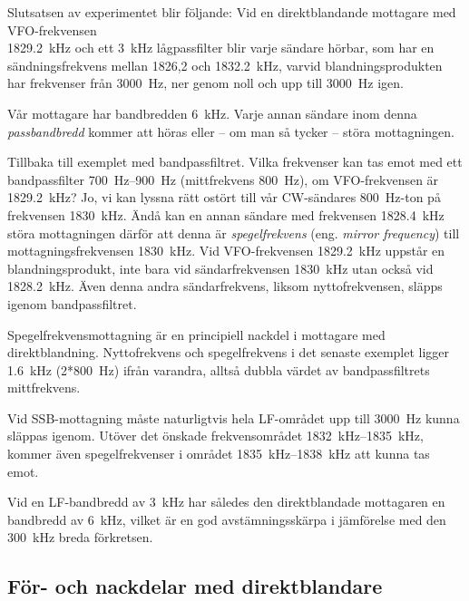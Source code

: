 Slutsatsen av experimentet blir följande:
Vid en direktblandande mottagare med VFO-frekvensen \\ \SI{1829,2}{\kilo\hertz}
och ett \SI{3}{\kilo\hertz} lågpassfilter blir varje sändare hörbar, som har en
sändningsfrekvens mellan 1826,2 och \SI{1832,2}{\kilo\hertz}, varvid
blandningsprodukten har frekvenser från \SI{3000}{\hertz}, ner genom noll och
upp till \SI{3000}{\hertz} igen.


Vår mottagare har bandbredden \SI{6}{\kilo\hertz}.
Varje annan sändare inom denna \emph{passbandbredd} kommer att höras eller --
om man så tycker -- störa mottagningen.

Tillbaka till exemplet med bandpassfiltret.
Vilka frekvenser kan tas emot med ett bandpassfilter \SIrange{700}{900}{\hertz}
(mittfrekvens \SI{800}{\hertz}), om VFO-frekvensen är \SI{1829,2}{\kilo\hertz}?
Jo, vi kan lyssna rätt ostört till vår CW-sändares \SI{800}{\hertz}-ton på
frekvensen \SI{1830}{\kilo\hertz}.
Ändå kan en annan sändare med frekvensen \SI{1828,4}{\kilo\hertz} störa
mottagningen därför att denna är \emph{spegelfrekvens} (eng. \emph{mirror
frequency}) till mottagningsfrekvensen \SI{1830}{\kilo\hertz}.
Vid VFO-frekvensen \SI{1829,2}{\kilo\hertz} uppstår en blandningsprodukt, inte
bara vid sändarfrekvensen \SI{1830}{\kilo\hertz} utan också vid
\SI{1828,2}{\kilo\hertz}.
Även denna andra sändarfrekvens, liksom nyttofrekvensen, släpps igenom
bandpassfiltret.

Spegelfrekvensmottagning är en principiell nackdel i mottagare med
direktblandning.
Nyttofrekvens och spegelfrekvens i det senaste exemplet ligger
\SI{1,6}{\kilo\hertz} (\SI{2*800}{\hertz}) ifrån varandra, alltså dubbla värdet
av bandpassfiltrets mittfrekvens.

Vid SSB-mottagning måste naturligtvis hela LF-området upp till \SI{3000}{\hertz}
kunna släppas igenom.
Utöver det önskade frekvensområdet \SIrange{1832}{1835}{\kilo\hertz}, kommer
även spegelfrekvenser i området \SIrange{1835}{1838}{\kilo\hertz} att kunna tas
emot.

Vid en LF-bandbredd av \SI{3}{\kilo\hertz} har således den direktblandade
mottagaren en bandbredd av \SI{6}{\kilo\hertz}, vilket är en god
avstämningsskärpa i jämförelse med den \SI{300}{\kilo\hertz} breda förkretsen.

\subsection{För- och nackdelar med direkt\-blandare}

